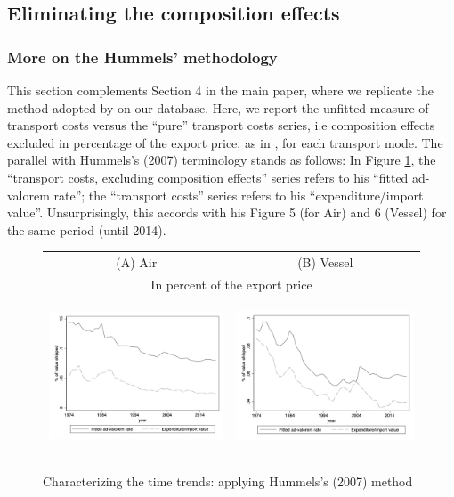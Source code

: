 \documentclass[11pt,twoside, authoryear]{elsarticle}
\begin{document}
\setcounter{table}{0}
\renewcommand{\thetable}{E.\arabic{table}}

\setcounter{figure}{0}
\renewcommand{\thefigure}{E.\arabic{figure}}

\subsection{Eliminating the composition effects} \label{sec_oa:comp-effects}

\subsubsection{More on the Hummels' methodology}

This section complements Section 4 in the main paper, where we replicate the method adopted by \cite{hummels2007} on our database. Here, we report the unfitted measure of transport costs versus the ``pure'' transport costs series, i.e composition effects excluded
in percentage of the export price, as in \cite{hummels2007}, for each transport mode. The parallel with Hummels's (2007) terminology stands as follows: In Figure \ref{fig:comp_effects_as_in_Hummels}, the ``transport costs, excluding composition effects'' series refers to his ``fitted ad-valorem rate''; the ``transport costs'' series refers to his ``expenditure/import value''. Unsurprisingly, this accords with his Figure 5 (for Air) and 6 (Vessel) for the same period (until 2014).

\begin{figure}[htbp]
\caption{Characterizing the time trends: applying Hummels's (2007) method }
\label{fig:comp_effects_as_in_Hummels}
\begin{center}
\begin{tabular}{cc}
{\small (A) Air } & {\small (B) Vessel }\\
\multicolumn{2}{c}{{\small In percent of the export price}} \\
\includegraphics[width=2.5in, height=1.8in]{figure5_comme_hummels.jpg}
& \includegraphics[width=2.5in,height=1.8in]{figure6_comme_hummels.jpg} \\
\end{tabular}
\end{center}
\end{figure}
\end{document}
